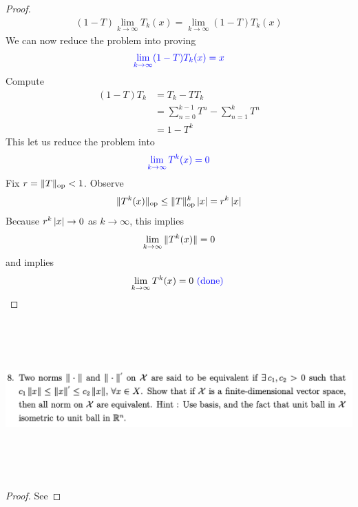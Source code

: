 \documentclass{report}
\begin{document}
\begin{proof}
\begin{align*}
  (1-T)\lim_{k\to \infty}T_k(x)=\lim_{k\to \infty}(1-T)T_k(x)
\end{align*}
We can now reduce the problem into proving 
\begin{align*}
  \textcolor{blue}{\lim_{k\to \infty}(1-T)T_k(x)=x}
\end{align*}
Compute 
\begin{align*}
  (1-T)T_k&=T_k-T T_k\\
  &=\sum_{n=0}^{k-1} T^n - \sum_{n=1}^{k} T^n\\
  &=1-T^k
\end{align*}
This let us reduce the problem into 
\begin{align*}
  \textcolor{blue}{\lim_{k\to \infty}T^k(x)=0}
\end{align*}
Fix $r=\| T \|_{\text{op}}<1$. Observe 
\begin{align*}
\| T^k(x) \|_{\text{op}}\leq \| T \|_\text{op}^k \left|x\right|=r^k \left|x\right| 
\end{align*}
Because $r^k\left|x\right|\to 0$ as $k\to \infty$, this implies 
\begin{align*}
  \lim_{k\to \infty}\| T^k(x) \|=0
\end{align*}
and implies 
\begin{align*}
\lim_{k\to \infty}T^k(x)=0\textcolor{blue}{\text{ (done) }}
\end{align*}


\end{proof}
\begin{question}{}{}
\includegraphics[height=6cm,width=18cm]{ahw4q8}
\end{question}
\begin{proof}
See 
\end{proof}
\end{document}
